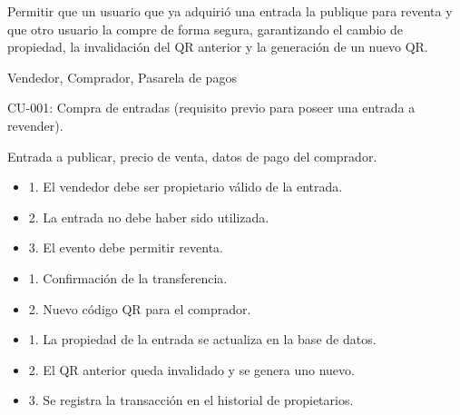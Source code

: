 \begin{description}[leftmargin=!, labelwidth=3.4cm, style=nextline, topsep=3pt]
\item[Objetivo] Permitir que un usuario que ya adquirió una entrada la publique para reventa y que otro usuario la compre de forma segura, garantizando el cambio de propiedad, la invalidación del QR anterior y la generación de un nuevo QR.

\item[Actores] Vendedor, Comprador, Pasarela de pagos

\item[CU relacionados] CU-001: Compra de entradas (requisito previo para poseer una entrada a revender).

\item[Entradas] Entrada a publicar, precio de venta, datos de pago del comprador.

\item[Pre-condiciones] \hfill
\begin{itemize}[leftmargin=1.2em, topsep=1pt]
  \item 1. El vendedor debe ser propietario válido de la entrada.
  \item 2. La entrada no debe haber sido utilizada.
  \item 3. El evento debe permitir reventa.
\end{itemize}

\item[Salidas] \hfill
\begin{itemize}[leftmargin=1.2em, topsep=1pt]
  \item 1. Confirmación de la transferencia.
  \item 2. Nuevo código QR para el comprador.
\end{itemize}

\item[Post-condiciones] \hfill
\begin{itemize}[leftmargin=1.2em, topsep=1pt]
  \item 1. La propiedad de la entrada se actualiza en la base de datos.
  \item 2. El QR anterior queda invalidado y se genera uno nuevo.
  \item 3. Se registra la transacción en el historial de propietarios.
\end{itemize}

\end{description}


